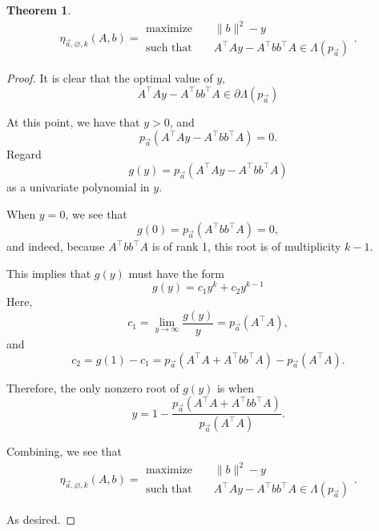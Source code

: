 \documentclass{amsart}
\newtheorem{theorem}{Theorem}[section]
\theoremstyle{definition}
\numberwithin{equation}{section}
\begin{document}
\begin{theorem}
\begin{equation*}
\eta_{\vec{a}, \varnothing, k}(A, b) =
\begin{aligned}
    \text{maximize} &&\|b\|^2 - y\\
    \text{such that } && A^{\intercal}Ay - A^{\intercal}bb^{\intercal}A \in \Lambda(p_{\vec{a}})
\end{aligned}.
\end{equation*}
\end{theorem}
\begin{proof}
    It is clear that the optimal value of $y$,
    \[
        A^{\intercal}Ay - A^{\intercal}bb^{\intercal}A \in \partial\Lambda(p_{\vec{a}})
    \]

    At this point, we have that $y > 0$, and
    \[
        p_{\vec{a}}(A^{\intercal}Ay - A^{\intercal}bb^{\intercal}A) = 0.
    \]
    Regard 
    \[
        g(y) = p_{\vec{a}}(A^{\intercal}Ay - A^{\intercal}bb^{\intercal}A)
    \]
    as a univariate polynomial in $y$.

    When $y = 0$, we see that 
    \[
        g(0) = p_{\vec{a}}(A^{\intercal}bb^{\intercal}A) = 0,
    \]
    and indeed, because $A^{\intercal}bb^{\intercal}A$ is of rank 1, this root is of multiplicity $k-1$.

    This implies that $g(y)$ must have the form
    \[
        g(y) = c_1y^k + c_2y^{k-1}
    \]
    Here, 
    \[
        c_1 = \lim_{y\rightarrow \infty} \frac{g(y)}{y} = p_{\vec{a}}(A^{\intercal}A),
    \]
    and 
    \[
        c_2 = g(1) - c_1 = p_{\vec{a}}(A^{\intercal}A+A^{\intercal}bb^{\intercal}A) -  p_{\vec{a}}(A^{\intercal}A).
    \]

    Therefore, the only nonzero root of $g(y)$ is when
    \[
        y = 1- \frac{p_{\vec{a}}(A^{\intercal}A+A^{\intercal}bb^{\intercal}A)}{p_{\vec{a}}(A^{\intercal}A)}.
    \]

    Combining, we see that 
    \begin{equation*}
    \eta_{\vec{a}, \varnothing, k}(A, b) =
    \begin{aligned}
        \text{maximize} &&\|b\|^2 - y\\
        \text{such that } && A^{\intercal}Ay - A^{\intercal}bb^{\intercal}A \in \Lambda(p_{\vec{a}})
    \end{aligned}.
    \end{equation*}

    As desired.
\end{proof}
\end{document}
